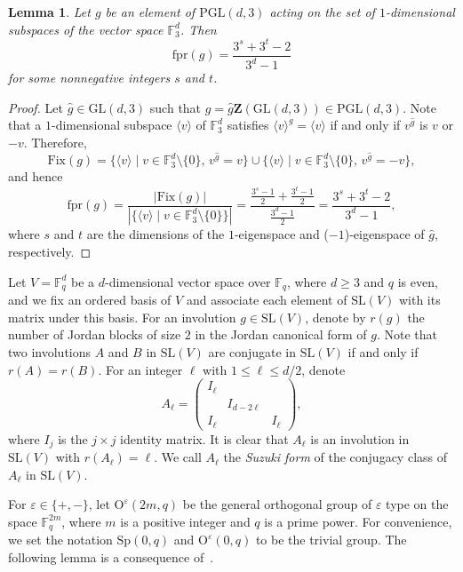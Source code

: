 \documentclass[11pt,a4paper,reqno]{amsart}
\newcommand{\bbF}{\mathbb{F}}
\newcommand{\Fix}{\mathrm{Fix}}
\newcommand{\fpr}{\mathrm{fpr}}
\newcommand{\GL}{\mathrm{GL}}
\newcommand{\PGL}{\mathrm{PGL}}
\newcommand{\rmO}{\mathrm{O}}
\newcommand{\SL}{\mathrm{SL}}
\newcommand{\Sp}{\mathrm{Sp}}
\newcommand{\Z}{\mathbf{Z}}
\newtheorem{lemma}[theorem]{Lemma}
\theoremstyle{definition}
\begin{document}
\begin{lemma}\label{lempgl}
Let $g$ be an element of $\PGL(d,3)$ acting on the set of $1$-dimensional subspaces of the vector space $\bbF_3^d$. Then
\[
\fpr(g)=\frac{3^s+3^t-2}{3^d-1}
\]
for some nonnegative integers $s$ and $t$.
\end{lemma}

\begin{proof}
Let $\hat{g}\in\GL(d,3)$ such that $g=\hat{g}\Z(\GL(d,3))\in\PGL(d,3)$. Note that a $1$-dimensional subspace $\langle v\rangle$ of $\bbF^d_3$ satisfies $\langle v\rangle^g=\langle v\rangle$ if and only if $v^{\hat{g}}$ is $v$ or $-v$. Therefore,
\[
\Fix(g)=\{\langle v\rangle\mid v\in\bbF^d_3\setminus\{0\},\,v^{\hat{g}}=v\}\cup\{\langle v\rangle\mid v\in\bbF^d_3\setminus\{0\},\,v^{\hat{g}}=-v\},
\]
and hence
\[
\fpr(g)=\frac{|\Fix(g)|}{|\{\langle v\rangle\mid v\in\mathbb{F}^d_3\setminus\{0\}\}|}=\frac{\frac{3^s-1}{2}+\frac{3^t-1}{2}}{\frac{3^d-1}{2}}=\frac{3^s+3^t-2}{3^d-1},
\]
where $s$ and $t$ are the dimensions of the $1$-eigenspace and ($-1$)-eigenspace of $\hat{g}$, respectively.
\end{proof}

Let $V=\bbF_q^d$ be a $d$-dimensional vector space over $\mathbb{F}_q$, where $d\geq3$ and $q$ is even, and we fix an ordered basis of $V$ and associate each element of $\SL(V)$ with its matrix under this basis. For an involution $g\in\SL(V)$, denote by $r(g)$ the number of Jordan blocks of size $2$ in the Jordan canonical form of $g$. Note that two involutions $A$ and $B$ in $\SL(V)$ are conjugate in $\SL(V)$ if and only if $r(A)=r(B)$. For an integer $\ell$ with $1\leq\ell\leq d/2$, denote
\[
A_\ell=\begin{pmatrix}I_\ell & & \\ & I_{d-2\ell} & \\ I_\ell & & I_\ell\end{pmatrix},
\]
where $I_j$ is the $j\times j$ identity matrix. It is clear that $A_\ell$ is an involution in $\SL(V)$ with $r(A_\ell)=\ell$. We call $A_\ell$ the \emph{Suzuki form} of the conjugacy class of $A_\ell$ in $\SL(V)$.

For $\varepsilon\in\{+,-\}$, let $\rmO^{\varepsilon}(2m,q)$ be the general orthogonal group of $\varepsilon$ type on the space $\bbF_q^{2m}$, where $m$ is a positive integer and $q$ is a prime power. For convenience, we set the notation $\Sp(0,q)$ and $\rmO^{\varepsilon}(0,q)$ to be the trivial group. The following lemma is a consequence of~\cite[Sections~7 and~8]{AS1976}.
\end{document}
